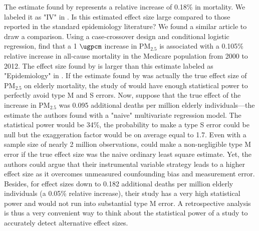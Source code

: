 \documentclass[12pt]{article}
\begin{document}
    The estimate found by \cite{deryugina_mortality_2019} represents a relative increase of 0.18\% in mortality. We labeled it as "IV" in . Is this estimated effect size large compared to those reported in the standard epidemiology literature? We found a similar article to draw a comparison. Using a case-crossover design and conditional logistic regression, \cite{di_association_2017} find that a 1 $\si{\ugpcm}$ increase in PM$_{2.5}$ is associated with a 0.105\% relative increase in all-cause mortality in the Medicare population from 2000 to 2012. The effect size found by \cite{deryugina_mortality_2019} is larger than this estimate labeled as "Epidemiology" in . If the estimate found by \cite{di_association_2017} was actually the true effect size of PM$_{2.5}$ on elderly mortality, the study of \cite{deryugina_mortality_2019} would have enough statistical power to perfectly avoid type M and S errors. Now, suppose that the true effect of the increase in PM$_{2.5}$ was 0.095 additional deaths per million elderly individuals---the estimate the authors found with a "naive" multivariate regression model. The statistical power would be 34\%, the probability to make a type S error could be null but the exaggeration factor would be on average equal to 1.7. Even with a sample size of nearly 2 million observations, \cite{deryugina_mortality_2019} could make a non-negligible type M error if the true effect size was the naive ordinary least square estimate. Yet, the authors could argue that their instrumental variable strategy leads to a higher effect size as it overcomes unmeasured counfounding bias and measurement error. Besides, for effect sizes down to 0.182 additional deaths per million elderly individuals (a 0.05\% relative increase), their study has a very high statistical power and would not run into substantial type M error. A retrospective analysis is thus a very convenient way to think about the statistical power of a study to accurately detect alternative effect sizes.
\end{document}
